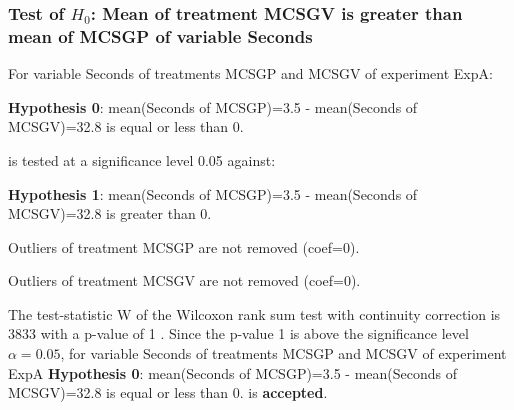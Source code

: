 \begin{frame}[t]
 \frametitle{Test of $H_{0}$: Mean of treatment MCSGV is greater than mean of MCSGP of variable Seconds }
 \scriptsize
 For variable Seconds of treatments MCSGP and MCSGV of experiment ExpA:

\vspace{1mm}
{\bf Hypothesis 0}: mean(Seconds of MCSGP)=3.5 - mean(Seconds of MCSGV)=32.8 is equal or less than 0.


 \begin{center} is tested at a significance level 0.05 against: \end{center}

{\bf Hypothesis 1}: mean(Seconds of MCSGP)=3.5 - mean(Seconds of MCSGV)=32.8 is greater than 0.
\vspace{1mm}
\vspace{1mm}

 Outliers of treatment MCSGP  are not removed (coef=0).

 Outliers of treatment MCSGV  are not removed (coef=0).
\vspace{1mm}
 
 The test-statistic W of the Wilcoxon rank sum test with continuity correction is 3833 with a p-value of 1 .
 Since the p-value 1 is above the significance level $\alpha= 0.05 $,
 for variable Seconds of treatments MCSGP and MCSGV of experiment ExpA 
 {\bf Hypothesis 0}: mean(Seconds of MCSGP)=3.5 - mean(Seconds of MCSGV)=32.8 is equal or less than 0.
is {\bf accepted}.

 \end{frame}
